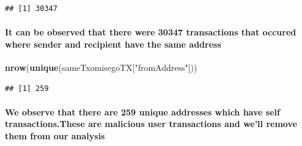 \documentclass[]{article}
\newenvironment{Shaded}{\begin{snugshade}}{\end{snugshade}}
\newcommand{\KeywordTok}[1]{\textcolor[rgb]{0.13,0.29,0.53}{\textbf{#1}}}
\newcommand{\StringTok}[1]{\textcolor[rgb]{0.31,0.60,0.02}{#1}}
\newcommand{\OperatorTok}[1]{\textcolor[rgb]{0.81,0.36,0.00}{\textbf{#1}}}
\newcommand{\NormalTok}[1]{#1}
\let\oldparagraph\paragraph
\renewcommand{\paragraph}[1]{\oldparagraph{#1}\mbox{}}
\begin{document}
\begin{Shaded}
\end{Shaded}

\begin{verbatim}
## [1] 30347
\end{verbatim}

\paragraph{It can be observed that there were 30347 transactions that
occured where sender and recipient have the same
address}\label{it-can-be-observed-that-there-were-30347-transactions-that-occured-where-sender-and-recipient-have-the-same-address}

\begin{Shaded}
\begin{Highlighting}[]
\KeywordTok{nrow}\NormalTok{(}\KeywordTok{unique}\NormalTok{(sameTxomisegoTX[}\StringTok{"fromAddress"}\NormalTok{]))}
\end{Highlighting}
\end{Shaded}

\begin{verbatim}
## [1] 259
\end{verbatim}

\paragraph{We observe that there are 259 unique addresses which have
self transactions.These are malicious user transactions and we'll remove
them from our
analysis}\label{we-observe-that-there-are-259-unique-addresses-which-have-self-transactions.these-are-malicious-user-transactions-and-well-remove-them-from-our-analysis}

\begin{Shaded}
\end{Shaded}
\end{document}
